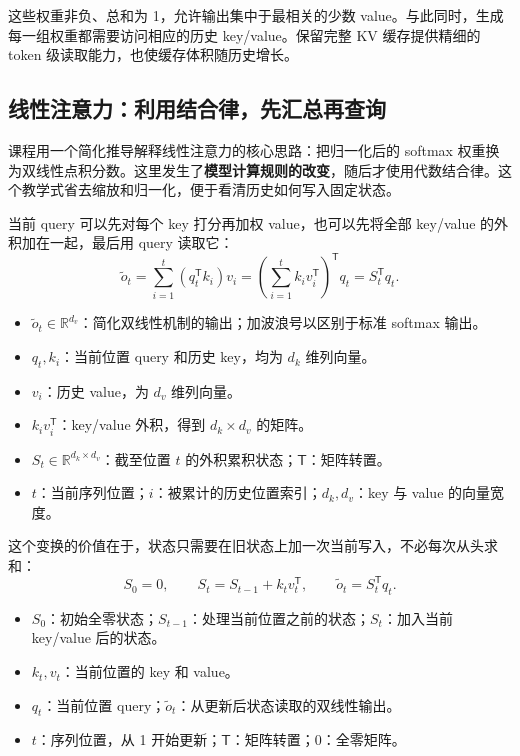 \documentclass[11pt,a4paper]{article}
\begin{document}
这些权重非负、总和为 1，允许输出集中于最相关的少数 value。与此同时，生成每一组权重都需要访问相应的历史 key/value。保留完整 KV 缓存提供精细的 token 级读取能力，也使缓存体积随历史增长。

\subsection{线性注意力：利用结合律，先汇总再查询}

课程用一个简化推导解释线性注意力的核心思路：把归一化后的 softmax 权重换为双线性点积分数。这里发生了\textbf{模型计算规则的改变}，随后才使用代数结合律。这个教学式省去缩放和归一化，便于看清历史如何写入固定状态。

当前 query 可以先对每个 key 打分再加权 value，也可以先将全部 key/value 的外积加在一起，最后用 query 读取它：
$$
\widetilde{o}_t
=\sum_{i=1}^{t}(q_t^{\mathsf T}k_i)v_i
=\left(\sum_{i=1}^{t}k_i v_i^{\mathsf T}\right)^{\mathsf T}q_t
=S_t^{\mathsf T}q_t.
$$
\begin{itemize}\setlength{\itemsep}{2pt}\setlength{\parsep}{0pt}
\item $\widetilde{o}_t\in\mathbb{R}^{d_v}$：简化双线性机制的输出；加波浪号以区别于标准 softmax 输出。
\item $q_t,k_i$：当前位置 query 和历史 key，均为 $d_k$ 维列向量。
\item $v_i$：历史 value，为 $d_v$ 维列向量。
\item $k_i v_i^{\mathsf T}$：key/value 外积，得到 $d_k\times d_v$ 的矩阵。
\item $S_t\in\mathbb{R}^{d_k\times d_v}$：截至位置 $t$ 的外积累积状态；$\mathsf T$：矩阵转置。
\item $t$：当前序列位置；$i$：被累计的历史位置索引；$d_k,d_v$：key 与 value 的向量宽度。
\end{itemize}

这个变换的价值在于，状态只需要在旧状态上加一次当前写入，不必每次从头求和：
$$
S_0=0,\qquad S_t=S_{t-1}+k_t v_t^{\mathsf T},\qquad
\widetilde{o}_t=S_t^{\mathsf T}q_t.
$$
\begin{itemize}
\item $S_0$：初始全零状态；$S_{t-1}$：处理当前位置之前的状态；$S_t$：加入当前 key/value 后的状态。
\item $k_t,v_t$：当前位置的 key 和 value。
\item $q_t$：当前位置 query；$\widetilde{o}_t$：从更新后状态读取的双线性输出。
\item $t$：序列位置，从 1 开始更新；$\mathsf T$：矩阵转置；$0$：全零矩阵。
\end{itemize}
\end{document}
